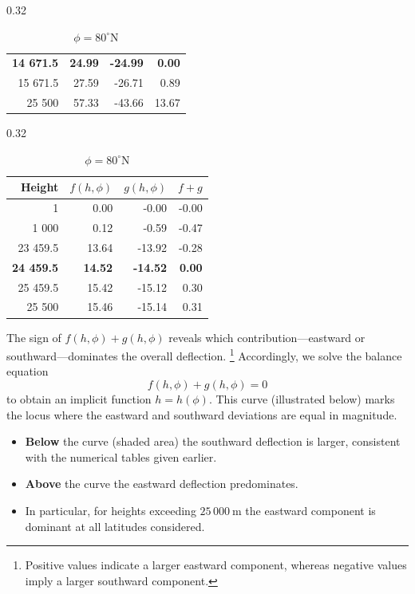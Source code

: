 \documentclass[11pt,en]{elegantpaper}
\begin{document}
\begin{table}[htbp]
\begin{subtable}[t]{0.32\textwidth}
\begin{tabular}{rrrr}
			\textbf{14 671.5} & \textbf{24.99} & \textbf{-24.99} & \textbf{0.00} \\
			15 671.5          & 27.59          & -26.71          & 0.89          \\
			25 500            & 57.33          & -43.66          & 13.67         \\
			\bottomrule
		\end{tabular}
	\end{subtable}
	\hfill
	\begin{subtable}[t]{0.32\textwidth}
		\centering
		\caption{$\phi = 80^{\circ}\mathrm{N}$}
		\begin{tabular}{rrrr}
			\toprule
			Height            & $f(h,\phi)$    & $g(h,\phi)$     & $f+g$         \\
			\midrule
			1                 & 0.00           & -0.00           & -0.00         \\
			1 000             & 0.12           & -0.59           & -0.47         \\
			23 459.5          & 13.64          & -13.92          & -0.28         \\
			\textbf{24 459.5} & \textbf{14.52} & \textbf{-14.52} & \textbf{0.00} \\
			25 459.5          & 15.42          & -15.12          & 0.30          \\
			25 500            & 15.46          & -15.14          & 0.31          \\
			\bottomrule
		\end{tabular}
	\end{subtable}
\end{table}


\noindent
The sign of \(f(h,\phi)+g(h,\phi)\) reveals which contribution—eastward or southward—dominates the overall deflection.%
\footnote{Positive values indicate a larger eastward component, whereas negative values imply a larger southward component.}
Accordingly, we solve the balance equation
\[
	f(h,\phi)+g(h,\phi)=0
\]
to obtain an implicit function \(h=h(\phi)\).
This curve (illustrated below) marks the locus where the eastward and southward deviations are equal in magnitude.
\begin{itemize}
	\item \textbf{Below} the curve (shaded area) the southward deflection is larger, consistent with the numerical tables given earlier.
	\item \textbf{Above} the curve the eastward deflection predominates.
	\item In particular, for heights exceeding \(25\,000\ \text{m}\) the eastward component is dominant at all latitudes considered.
\end{itemize}
\end{document}
